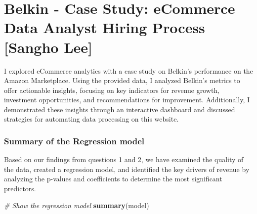 \documentclass[
]{article}
\author{Sangho Lee}
\date{7/12/2024}
\newenvironment{Shaded}{\begin{snugshade}}{\end{snugshade}}
\newcommand{\CommentTok}[1]{\textcolor[rgb]{0.56,0.35,0.01}{\textit{#1}}}
\newcommand{\FunctionTok}[1]{\textcolor[rgb]{0.13,0.29,0.53}{\textbf{#1}}}
\newcommand{\NormalTok}[1]{#1}
\begin{document}
\section{Belkin - Case Study: eCommerce Data Analyst Hiring Process
{[}Sangho
Lee{]}}\label{belkin---case-study-ecommerce-data-analyst-hiring-process-sangho-lee}

I explored eCommerce analytics with a case study on Belkin's performance
on the Amazon Marketplace. Using the provided data, I analyzed Belkin's
metrics to offer actionable insights, focusing on key indicators for
revenue growth, investment opportunities, and recommendations for
improvement. Additionally, I demonstrated these insights through an
interactive dashboard and discussed strategies for automating data
processing on this website.

\subsubsection{Summary of the Regression
model}\label{summary-of-the-regression-model}

Based on our findings from questions 1 and 2, we have examined the
quality of the data, created a regression model, and identified the key
drivers of revenue by analyzing the p-values and coefficients to
determine the most significant predictors.

\begin{Shaded}
\begin{Highlighting}[]
\CommentTok{\# Show the regression model}
\FunctionTok{summary}\NormalTok{(model)}
\end{Highlighting}
\end{Shaded}
\end{document}
